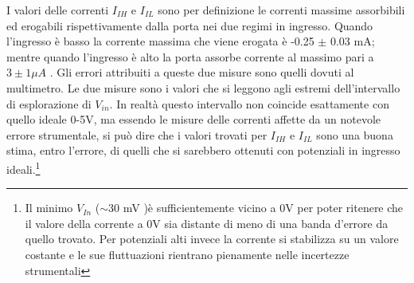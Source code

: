 I valori delle correnti $I_{IH}$ e $I_{IL}$ sono per definizione le correnti massime assorbibili ed erogabili rispettivamente dalla porta nei due regimi in ingresso. Quando l'ingresso è basso la corrente massima che viene erogata è -0.25 $\pm$ 0.03 mA; mentre quando l'ingresso è alto la porta assorbe corrente al massimo pari a $3 \pm 1 \mu A$ . Gli errori attribuiti a queste due misure sono quelli dovuti al multimetro. Le due misure sono i valori che si leggono agli estremi dell'intervallo di esplorazione di $V_{in}$. In realtà questo intervallo non coincide esattamente con quello ideale 0-5V, ma essendo le misure delle correnti affette da un notevole errore strumentale, si può dire che i valori trovati per $I_{IH}$ e $I_{IL}$ sono una buona stima, entro l'errore, di quelli che si sarebbero ottenuti con potenziali in ingresso ideali.\footnote{Il minimo $V_{In}$ ($\sim$30 mV )è sufficientemente vicino a 0V per poter ritenere che il valore della corrente a 0V sia distante di meno di una banda d'errore da quello trovato. Per potenziali alti invece la corrente si stabilizza su un valore costante e le sue fluttuazioni rientrano pienamente nelle incertezze strumentali}
